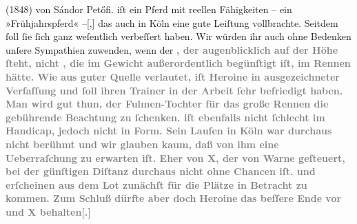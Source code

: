 \begin{ledgroupsized}[t]{13cm}
{{{{{                        (1848) von Sándor
                     Petőfi.}}}\label{K_L02914-88h} iſt ein Pferd mit reellen Fähigkeiten – ein
                  »Frühjahrspferd« –{[},{]} das auch in Köln eine gute Leiſtung vollbrachte. Seitdem ſoll ſie ſich
                  ganz weſentlich verbeſſert haben. Wir würden ihr auch ohne Bedenken unſere
                  Sympathien zuwenden, wenn der }}\textcolor{gray}{\textbf{}}\textcolor{gray}{\textbf{, der augenblicklich auf der Höhe ſteht, nicht
                     , die im Gewicht außerordentlich begünſtigt
                  iſt, im Rennen hätte. Wie aus guter Quelle verlautet, iſt Heroine in
                  ausgezeichneter Verfaſſung und ſoll ihren Trainer in der Arbeit ſehr befriedigt
                  haben. Man wird gut thun, der Fulmen-Tochter für das große Rennen die gebührende
                  Beachtung zu ſchenken.  iſt ebenfalls nicht
                  ſchlecht im Handicap, jedoch nicht in Form. Sein Laufen in Köln war durchaus nicht berühmt und wir glauben kaum, daß
                  von ihm eine Ueberraſchung zu erwarten iſt. Eher von \textsc{X},
                  der von Warne geſteuert, bei der günſtigen
                  Diſtanz durchaus nicht ohne Chancen iſt.  und  erſcheinen aus dem Lot zunächſt für die Plätze in
                  Betracht zu kommen. Zum Schluß dürfte aber doch}}\pend
           \pstart
           \centering{}\textcolor{gray}{\textbf{\textbf{Heroine}}}\pend
           \pstart
           \noindent{}\textcolor{gray}{\textbf{das beſſere Ende vor}}{ }\textcolor{gray}{\textbf{}}\textcolor{gray}{\textbf{{ }und \textsc{X}
                     behalten{[}.{]}}}\pend
           
         
         \endnumbering{}\end{ledgroupsized}  \newcommand{\dateiname}{L02914}\newcommand{\titel}{Paul Goldmann an Arthur Schnitzler, 2. 5. [1900]}\newcommand{\editorInnen}{Martin Anton Müller und Laura Untner}
      